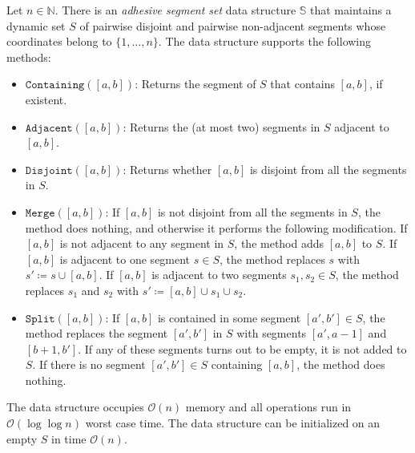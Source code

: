 \documentclass[runningheads]{llncs}
\newcommand{\Oh}{\mathcal{O}}
\begin{document}
\begin{lemma}\label{lem:segment_tree}
Let $n \in \mathbb{N}$. There is an \emph{adhesive segment set} data
structure $\mathbb{S}$ that
maintains a
dynamic set $S$ of
pairwise disjoint and pairwise non-adjacent segments
whose coordinates belong to $\{ 1, \ldots, n \}$.
The data structure supports
the following methods:
\begin{itemize}
	\item $\mathtt{Containing}([a,b])$: Returns the segment
	of $S$ that contains
	$[a,b]$, if existent. 
	\item $\mathtt{Adjacent}([a,b])$: Returns the (at most two)
	segments in $S$
	adjacent to $[a,b]$.
	\item $\mathtt{Disjoint}([a,b])$: Returns whether $[a,b]$ is disjoint from all the segments in $S$.
\item $\mathtt{Merge}([a,b])$: If $[a,b]$ is not disjoint from all the segments in $S$, the method does nothing, and otherwise it performs the following modification. If $[a,b]$ is not adjacent to any segment in $S$, the method adds $[a,b]$ to $S$. If $[a,b]$ is adjacent to one segment $s\in S$, the method replaces $s$ with $s'\coloneqq s\cup [a,b]$. If $[a,b]$ is adjacent to two segments $s_1,s_2\in S$, the method replaces $s_1$ and $s_2$ with $s'\coloneqq [a,b] \cup s_1 \cup s_2$.
\item $\mathtt{Split}([a,b])$: If $[a,b]$
 is contained
 in some segment $[a',b'] \in S$, the method
 replaces the segment $[a',b']$ in
 $S$ with segments $[a',a-1]$ and $[b+1,b']$. If any of these segments turns out to be empty, it is not added to $S$. If there is no segment $[a',b']\in S$ containing $[a,b]$, the method does nothing.
\end{itemize}
The data structure occupies $\Oh(n)$ memory and all operations
run in $\Oh(\log \log n)$ worst case time. The data structure can be initialized on an empty $S$ in time $\Oh(n)$.
\end{lemma}
\end{document}
